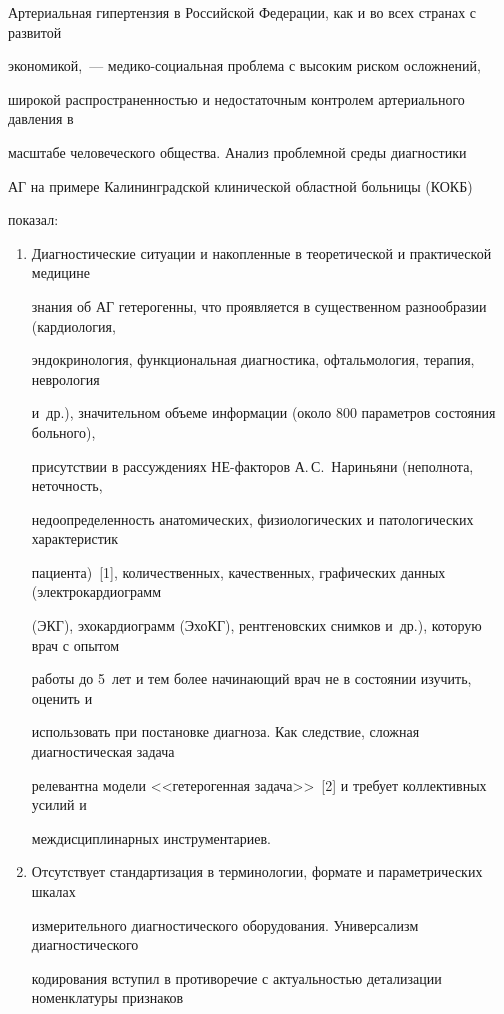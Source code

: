  Артериальная гипертензия в Российской Федерации, как и во всех странах с развитой


экономикой,~--- ме\-ди\-ко-со\-ци\-аль\-ная проб\-ле\-ма с высоким риском осложнений,


широкой распространенностью и недостаточным контролем артериального давления в


масштабе человеческого общества. Анализ проблемной среды диагностики


АГ на примере Калининградской клинической областной больницы (КОКБ)


показал:


 \begin{enumerate}[1.]


\item Диагностические ситуации и накопленные в теоретической и практической медицине


знания об АГ гетерогенны, что проявляется в существенном разнообразии (кардиология,


эндокринология, функциональная диагностика, офтальмология, терапия, неврология


и~др.), значительном объеме информации (около 800 параметров состояния больного),


присутствии в рассуждениях НЕ-фак\-то\-ров А.\,С.~Нариньяни (неполнота, неточность,


недоопределенность анатомических, физиологических и патологических характеристик


пациента)~[1], количественных, качественных, графических данных (электрокардиограмм


(ЭКГ), эхокардиограмм (ЭхоКГ), рентгеновских снимков и~др.), которую врач с опытом


работы до 5~лет и тем более начинающий врач не в состоянии изучить, оценить и


использовать при постановке диагноза. Как следствие, сложная диагностическая задача


релевантна модели <<гетерогенная задача>>~[2] и требует коллективных усилий и


междисциплинарных инструментариев.


 \item Отсутствует стандартизация в терминологии, формате и параметрических шкалах


измерительного диагностического оборудования. Универсализм диагностического


кодирования вступил в противоречие с актуальностью детализации номенклатуры признаков



\end{enumerate}
